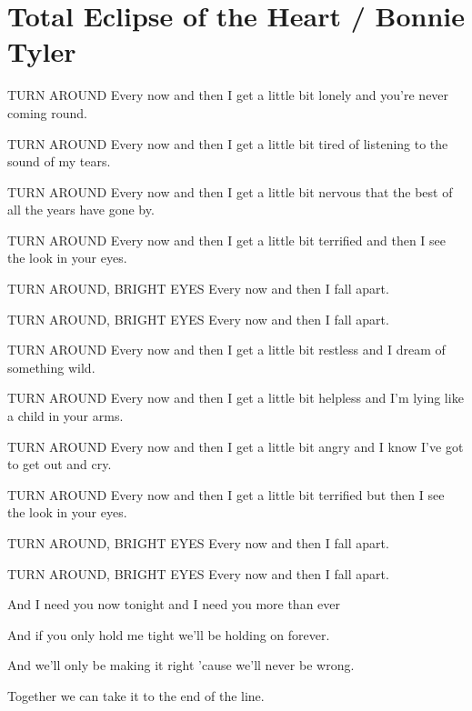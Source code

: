 \section{Total Eclipse of the Heart / Bonnie Tyler}\label{sec:totaleclipseoftheheart}
\Bminor
\Amajor
\DmajorEasy
\Cmajor
\Fmajor
\BflatMajor
\Bmajor
\EmajorEasy
\FsharpMinor
\Fminor

TURN AROUND Every now and then I get a little bit lonely and you're never coming
round.

TURN AROUND Every now and then I get a little bit tired of listening to the sound of
my tears.

TURN AROUND Every now and then I get a little bit nervous that the best of all the
years have gone by.

TURN AROUND Every now and then I get a little bit terrified and then I see the look in
your eyes.

TURN AROUND, BRIGHT EYES Every now and then I fall apart.

TURN AROUND, BRIGHT EYES Every now and then I fall apart.

TURN AROUND Every now and then I get a little bit restless and I dream of
something wild.

TURN AROUND Every now and then I get a little bit helpless and I'm lying like
a child in your arms.

TURN AROUND Every now and then I get a little bit angry and I know I've got to
get out and cry.

TURN AROUND Every now and then I get a little bit terrified but then I see the
look in your eyes.

TURN AROUND, BRIGHT EYES Every now and then I fall apart.

TURN AROUND, BRIGHT EYES Every now and then I fall apart.

And I need you now tonight and I need you more than ever

And if you only hold me tight we'll be holding on forever.

And we'll only be making it right 'cause we'll never be wrong.

Together we can take it to the end of the line.


